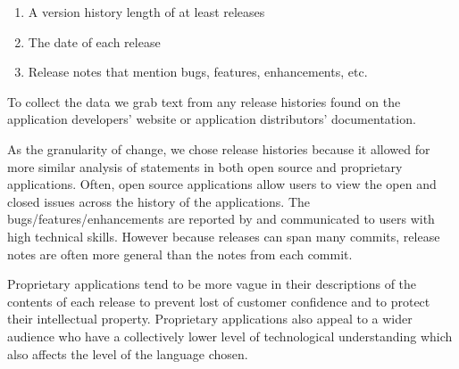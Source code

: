 \documentclass{acm_proc_article-sp}
\begin{document}
\begin{enumerate}
	\item A version history length of at least \MinNumReleases releases
	\item The date of each release
	\item Release notes that mention bugs, features, enhancements, etc.
\end{enumerate}

To collect the data we grab text from any release histories found on the application developers' website or application distributors' documentation. 

As the granularity of change, we chose release histories because it allowed for more similar analysis of statements in both open source and proprietary applications. 
Often, open source applications allow users to view the open and closed issues across the history of the applications. 
The bugs/features/enhancements are reported by and communicated to users with high technical skills. 
However because releases can span many commits, release notes are often more general than the notes from each commit.

Proprietary applications tend to be more vague in their descriptions of the contents of each release to prevent lost of customer confidence and to protect their intellectual property. 
Proprietary applications also appeal to a wider audience who have a collectively lower level of technological understanding which also affects the level of the language chosen.
\end{document}
